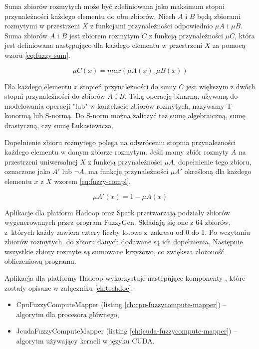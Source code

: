 Suma zbiorów rozmytych może być zdefiniowana jako maksimum stopni przynależności każdego elementu do
obu zbiorów. Niech \(A\) i \(B\) będą zbiorami rozmytymi w przestrzeni \(X\) z funkcjami
przynależności odpowiednio \(\mu A\) i \(\mu B\). Suma zbiorów \(A\) i \(B\) jest zbiorem rozmytym
\(C\) z funkcją przynależności \(\mu C\), która jest definiowana następująco dla każdego elementu
w przestrzeni \(X\) za pomocą wzoru \ref{eq:fuzzy-sum}.

\begin{equation}
    \mu C(x) = max(\mu A(x), \mu B(x))
    \label{eq:fuzzy-sum}
\end{equation}

Dla każdego elementu \(x\) stopień przynależności do sumy \(C\) jest większym z dwóch stopni
przynależności do zbiorów \(A\) i \(B\). Taką operację binarną, używaną do modelowania operacji
"lub" w kontekście zbiorów rozmytych, nazywamy T-konormą lub S-normą. Do S-norm można zaliczyć
też sumę algebraiczną, sumę drastyczną, czy sumę Łukasiewicza.

Dopełnienie zbioru rozmytego polega na odwróceniu stopnia przynależności każdego elementu w
danym zbiorze rozmytym. Jeśli mamy zbiór rozmyty \(A\) na przestrzeni uniwersalnej \(X\) z
funkcją przynależności \(\mu A\), dopełnienie tego zbioru, oznaczone jako \(A'\) lub \(\lnot A\),
ma funkcję przynależności \(\mu A'\) określoną dla każdego elementu \(x\) z \(X\)
wzorem \ref{eq:fuzzy-compl}.

\begin{equation}
    \mu A'(x) = 1 - \mu A(x)
    \label{eq:fuzzy-compl}
\end{equation}

Aplikacje dla platform Hadoop oraz Spark przetwarzają podziały zbiorów wygenerowanych przez program
FuzzyGen. Składają się one z 64 zbiorów, z~których każdy zawiera cztery liczby losowe z~zakresu od
0 do 1. Po wczytaniu zbiorów rozmytych, do zbioru danych dodawane są ich dopełnienia.
Następnie wszystkie zbiory rozmyte są sumowane krzyżowo, co zwiększa złożoność obliczeniową programu.

Aplikacja dla platformy Hadoop wykorzystuje następujące komponenty ,
które zostały opisane w załączniku \ref{ch:techdoc}:
\begin{itemize}
	\item CpuFuzzyComputeMapper (listing \ref{ch:cpu-fuzzycompute-mapper}) -- algorytm dla procesora głównego,
	\item JcudaFuzzyComputeMapper (listing \ref{ch:jcuda-fuzzycompute-mapper}) -- algorytm używający kerneli w języku CUDA.
\end{itemize}


